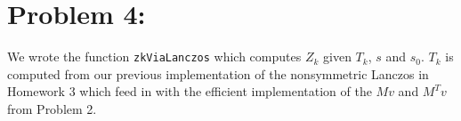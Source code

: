 \section*{Problem 4:}
We wrote the function \texttt{zkViaLanczos} which computes $Z_k$	given $T_{k}$, $s$ and $s_{0}$. $T_{k}$ is computed from our previous implementation of the nonsymmetric Lanczos in Homework 3 which feed in with the efficient implementation of the $Mv$ and $M^{T}v$ from Problem 2. 


